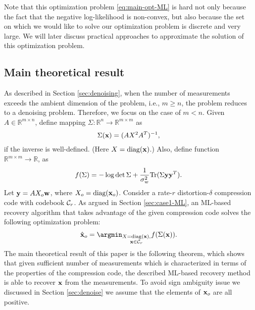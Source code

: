 \documentclass[onecolumn]{IEEEtran}
\newcommand{\wv}{{\bf w}}
\begin{document}
Note that this optimization problem \eqref{eq:main-opt-ML} is hard not only because the fact that the negative log-likelihood is non-convex, but also because the set on which we would like to solve our optimization problem is discrete and very large. We will later discuss practical approaches to approximate the solution of this optimization problem. 



\subsection{Main theoretical result}


As described in Section \ref{sec:denoising}, when the number of measurements exceeds the ambient dimension of the problem, i.e., $m\geq n$, the problem reduces to a denoising problem. Therefore, we focus on the case of $m<n$. 
Given $A\in\mathds{R}^{m\times n}$, define mapping $\Sigma: \mathds{R}^n\to \mathds{R}^{m\times m}$ as
\begin{align}
\Sigma({\bf x})=(AX^2A^T)^{-1},
\end{align}
if the inverse is well-defined. (Here $X=\mathop{\rm diag}\nolimits({{\bf x}})$.) Also, define function $\mathds{R}^{m\times m}\to\mathds{R}$, as 
\[
f(\Sigma)=-\log\det \Sigma +{1\over \sigma_w^2}{\rm Tr}(\Sigma{\bf y}{\bf y}^T).
\]
Let $\yv=AX_o\wv$, where $X_o=\mathop{\rm diag}\nolimits({{\bf x}_o})$. Consider a rate-$r$ distortion-$\delta$ compression code with codebook $\mathcal{C}_r$. As argued in Section \ref{sec:case1-ML},  an ML-based recovery algorithm that takes advantage of the given compression code solves the following optimization problem:
\begin{align}
\hat{\xv}_o=\argmin_{\substack{X=\diag({\xv}), \\ \xv\in\Cc_r}} f(\Sigma(\xv)).\label{eq:min-f-main}
\end{align}
The main theoretical result of this paper is the following theorem, which shows that given sufficient number of measurements which is characterized in terms of the properties of the compression code, the described ML-based recovery method is able to recover ${\bf x}$ from the measurements. To avoid sign ambiguity issue we discussed in Section \ref{sec:denoise} we assume that the elements of ${\bf x}_o$ are all positive. 
\end{document}
